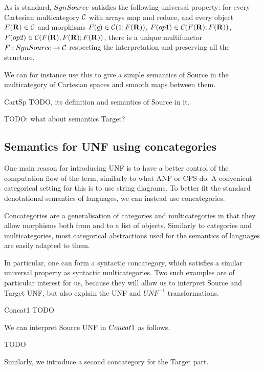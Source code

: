 As is standard, $SynSource$ satisfies the following universal property: 
for every Cartesian multicategory $\mathcal{C}$ with arrays map and reduce,
and every object $F(\mathbf{R})\in\mathcal{C}$ and morphisms $F(\underline{c})\in\mathcal{C}(1;F(\mathbf{R}))$, 
$F(op1)\in\mathcal{C}(F(\mathbf{R});F(\mathbf{R}))$, $F(op2)\in\mathcal{C}(F(\mathbf{R}),F(\mathbf{R});F(\mathbf{R}))$, there is a unique
multifunctor $F:SynSource\to\mathcal{C}$ respecting the interpretation and preserving all the structure.

We can for instance use this to give a simple semantics of Source 
in the multicategory of Cartesian spaces and smooth maps between them. 

\begin{definition}{CartSp}
    TODO, its definition and semantics of Source in it.
\end{definition}

TODO: what about semantics Target?

\subsection{Semantics for UNF using concategories} %
\label{sub:Semantics for UNF using concategories}

One main reason for introducing UNF is to have a better control 
of the computation flow of the term, similarly to what ANF or CPS do. 
A convenient categorical setting for this is to use string diagrams.
To better fit the standard denotational semantics of languages, 
we can instead use concategories. 

Concategories are a generalisation of categories and multicategories in that 
they allow morphisms both from and to a list of objects. 
Similarly to categories and multicategories, 
most categorical abstractions used for the semantics of languages are easily adapted to them.

In particular, one can form a syntactic concategory, 
which satisfies a similar universal property as syntactic multicategories.
Two such examples are of particular interest for us, 
because they will allow us to interpret Source and Target UNF, 
but also explain the UNF and $UNF^{-1}$ transformations.

\begin{example}{Concat1}
    TODO
\end{example}

We can interpret Source UNF in $Concat1$ as follows.

TODO

Similarly, we introduce a second concategory for the Target part.


